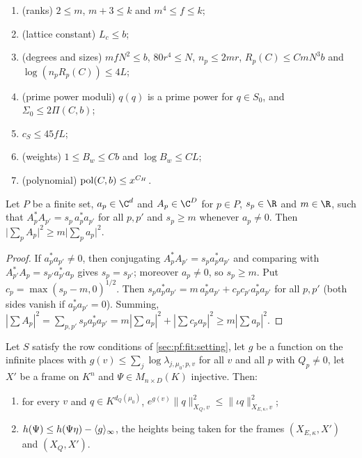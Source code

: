 \begin{definition}
\begin{enumerate}[label=(L\arabic*),leftmargin=*]
$\eta,s,c$ the heights $\fitht_{g_T(\eta,s,\cdot)}(z_T(\eta,s))$ and $\fitht_{g_T(\eta,s,\cdot)}(z_{Td}(\eta,c,s))$ are at most
$B_{\mathrm{TH}}(x)$;
\item\label{pf:fit:L:Const} (ranks) $2\le m$, $m+3\le k$ and $m^4\le f\le k$;
\item\label{pf:fit:L:Lc} (lattice constant) $L_c\le b$;
\item\label{pf:fit:L:Size} (degrees and sizes) $mfN^2\le b$, $80r^4\le N$, $n_p\le2mr$, $R_p(C)\le CmN^3b$ and
$\log(n_pR_p(C))\le4L$;
\item\label{pf:fit:L:Mod} (prime power moduli) $q(q)$ is a prime power for $q\in S_0$, and $\Sigma_0\le2\Pi(C,b)$;
\item\label{pf:fit:L:CS} $c_S\le45fL$;
\item\label{pf:fit:L:Wt} (weights) $1\le B_w\le Cb$ and $\log B_w\le CL$;
\item\label{pf:fit:L:Pol} (polynomial) $\operatorname{pol}(C,b)\le x^{C_H}$.
\end{enumerate}
\end{definition}

\begin{lemma}\label{pf:fit:gram}
Let $P$ be a finite set, $a_p\in\C^d$ and $A_p\in\C^{D}$ for $p\in P$, $s_p\in\R$ and $m\in\R$, such that
$A_p^*A_{p'}=s_p\,a_p^*a_{p'}$ for all $p,p'$ and $s_p\ge m$ whenever $a_p\ne0$. Then
$\bigl|\sum_pA_p\bigr|^2\ge m\bigl|\sum_pa_p\bigr|^2$.
\end{lemma}

\begin{proof}
If $a_p^*a_{p'}\ne0$, then conjugating $A_p^*A_{p'}=s_pa_p^*a_{p'}$ and comparing with $A_{p'}^*A_p=s_{p'}a_{p'}^*a_p$ gives
$s_p=s_{p'}$; moreover $a_p\ne0$, so $s_p\ge m$. Put $c_p=\max(s_p-m,0)^{1/2}$. Then
$s_pa_p^*a_{p'}=m\,a_p^*a_{p'}+c_pc_{p'}a_p^*a_{p'}$ for all $p,p'$ (both sides vanish if $a_p^*a_{p'}=0$). Summing,
$|\sum A_p|^2=\sum_{p,p'}s_pa_p^*a_{p'}=m|\sum a_p|^2+|\sum c_pa_p|^2\ge m|\sum a_p|^2$.
\end{proof}

\begin{lemma}\label{pf:fit:ip}
Let $S$ satisfy the row conditions of \cref{sec:pf:fit:setting}, let $g$ be a function on the infinite places with
$g(v)\le\sum_j\log\lambda_{j,\mu_0,p,v}$ for all $v$ and all $p$ with $Q_p\ne0$, let $X'$ be a frame on $K^n$ and
$\Psi\in M_{n\times D}(K)$ injective. Then:
\begin{enumerate}[label=(\alph*)]
\item for every $v$ and $q\in K^{d_Q(\mu_0)}$, $e^{g(v)}\|q\|^2_{X_Q,v}\le\|\iota q\|^2_{X_{E,\kappa},v}$;
\item $h(\Psi)\le h(\Psi\eta)-\langle g\rangle_{\infty}$, the heights being taken for the frames $(X_{E,\kappa},X')$ and $(X_Q,X')$.
\end{enumerate}
\end{lemma}

